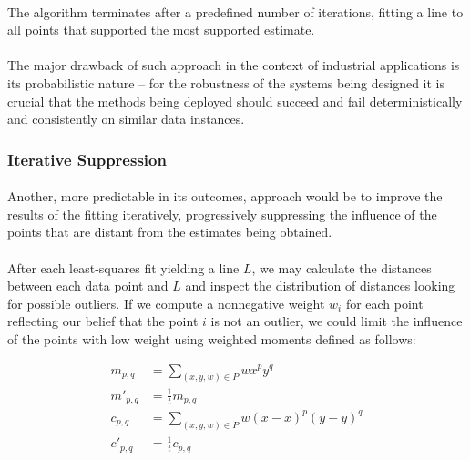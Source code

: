 \paragraph*{}
The algorithm terminates after a predefined number of iterations, fitting a line to all points that supported the most supported estimate.

\paragraph*{}
The major drawback of such approach in the context of industrial applications is its probabilistic nature -- for the robustness of the systems being designed it is crucial that the methods being deployed should succeed and fail deterministically and consistently on similar data instances.

\subsubsection{Iterative Suppression}

\paragraph*{}
Another, more predictable in its outcomes, approach would be to improve the results of the fitting iteratively, progressively suppressing the influence of the points that are distant from the estimates being obtained. 

\paragraph*{}
After each least-squares fit yielding a line $L$, we may calculate the distances between each data point and $L$ and inspect the distribution of distances looking for possible outliers. If we compute a nonnegative weight $w_i$ for each point reflecting our belief that the point $i$ is not an outlier, we could limit the influence of the points with low weight using weighted moments defined as follows:

\begin{align*}
	m_{p,q} &= \sum_{(x,y,w) \in P} w {x}^p {y}^q \\
	m'_{p,q} &= \frac{1}{t} m_{p,q} \\
	c_{p,q} &= \sum_{(x,y,w) \in P} w ({x}-\overline{x})^p ({y}-\overline{y})^q \\
	c'_{p,q} &= \frac{1}{t} c_{p,q}
\end{align*}

